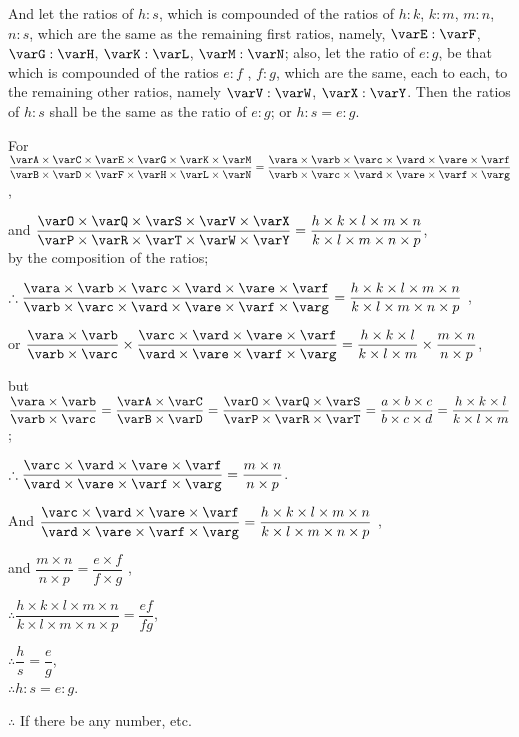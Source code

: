 \documentclass[booklanguage=english]{byrnebook}
\begin{document}
And let the ratios of $h : s$, which is compounded of the ratios of $h : k$, $k : m$, $m : n$, $n : s$, which are the same as the remaining first ratios, namely, $\varE : \varF$, $\varG : \varH$, $\varK : \varL$, $\varM : \varN$; also, let the ratio of $e : g$, be that which is compounded of the ratios $e : f$ , $f : g$, which are the same, each to each, to the remaining other ratios, namely $\varV : \varW$, $\varX : \varY$. Then the ratios of $h : s$ shall be the same as the ratio of $e : g$; or $h : s = e : g$.

\begin{center}
For $\dfrac
{\varA \times \varC \times \varE \times \varG \times \varK \times \varM}
{\varB \times \varD \times \varF \times \varH \times \varL \times \varN}
=
\dfrac
{\vara \times \varb \times \varc \times \vard \times \vare \times \varf}
{\varb \times \varc \times \vard \times \vare \times \varf \times \varg}$,

and $\dfrac
{\varO \times \varQ \times \varS \times \varV \times \varX}
{\varP \times \varR \times \varT \times \varW \times \varY}
=
\dfrac
{h \times k \times l \times m \times n}
{k \times l \times m \times n \times p}$,\\
by the composition of the ratios;

$\therefore \dfrac
{\vara \times \varb \times \varc \times \vard \times \vare \times \varf}
{\varb \times \varc \times \vard \times \vare \times \varf \times \varg}
=
\dfrac
{h \times k \times l \times m \times n}
{k \times l \times m \times n \times p}$ \byref{\hypref},

or $\dfrac{\vara \times \varb}{\varb \times \varc}
\times
\dfrac
{\varc \times \vard \times \vare \times \varf}
{\vard \times \vare \times \varf \times \varg}
=
\dfrac
{h \times k \times l}
{k \times l \times m}
\times
\dfrac
{m \times n}
{n \times p}$,

but $\dfrac{\vara \times \varb}{\varb \times \varc} = \dfrac{\varA \times \varC}{\varB \times \varD}
=
\dfrac
{\varO \times \varQ \times \varS}
{\varP \times \varR \times \varT}
=
\dfrac{a \times b \times c}{b \times c \times d}
=
\dfrac{h \times k \times l}{k \times l \times m}$;

$\therefore
\dfrac
{\varc \times \vard \times \vare \times \varf}
{\vard \times \vare \times \varf \times \varg}
=
\dfrac
{m \times n}
{n \times p}$.

And $\dfrac
{\varc \times \vard \times \vare \times \varf}
{\vard \times \vare \times \varf \times \varg}
= \dfrac
{h \times k \times l \times m \times n}
{k \times l \times m \times n \times p}$ \byref{\hypref},

and $\dfrac
{m \times n}
{n \times p}
=
\dfrac
{e \times f}
{f \times g}$ \byref{\hypref},

$\therefore \dfrac
{h \times k \times l \times m \times n}
{k \times l \times m \times n \times p}
= \dfrac{e f}{f g}$,

$\therefore \dfrac{h}{s} = \dfrac{e}{g}$,\\
$\therefore h : s = e : g$.

$\therefore$ If there be any number, etc.
\end{center}
\end{document}
